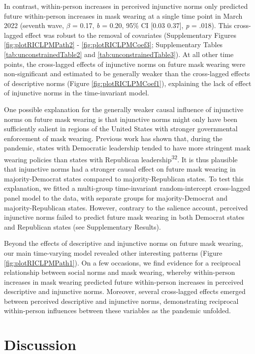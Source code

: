 \documentclass[
  man, donotrepeattitle,floatsintext]{apa6}
\begin{document}
In contrast, within-person increases in perceived injunctive norms only predicted future within-person increases in mask wearing at a single time point in March 2022 (seventh wave, \(\beta\) = 0.17, \emph{b} = 0.20, 95\% CI {[}0.03 0.37{]}, \emph{p} = .018). This cross-lagged effect was robust to the removal of covariates (Supplementary Figures \ref{fig:plotRICLPMPath2} - \ref{fig:plotRICLPMCoef3}; Supplementary Tables \ref{tab:unconstrainedTable2} and \ref{tab:unconstrainedTable3}). At all other time points, the cross-lagged effects of injunctive norms on future mask wearing were non-significant and estimated to be generally weaker than the cross-lagged effects of descriptive norms (Figure \ref{fig:plotRICLPMCoef1}), explaining the lack of effect of injunctive norms in the time-invariant model.

One possible explanation for the generally weaker causal influence of injunctive norms on future mask wearing is that injunctive norms might only have been sufficiently salient in regions of the United States with stronger governmental enforcement of mask wearing. Previous work has shown that, during the pandemic, states with Democratic leadership tended to have more stringent mask wearing policies than states with Republican leadership\textsuperscript{32}. It is thus plausible that injunctive norms had a stronger causal effect on future mask wearing in majority-Democrat states compared to majority-Republican states. To test this explanation, we fitted a multi-group time-invariant random-intercept cross-lagged panel model to the data, with separate groups for majority-Democrat and majority-Republican states. However, contrary to the salience account, perceived injunctive norms failed to predict future mask wearing in both Democrat states and Republican states (see Supplementary Results).

Beyond the effects of descriptive and injunctive norms on future mask wearing, our main time-varying model revealed other interesting patterns (Figure \ref{fig:plotRICLPMPath1}). On a few occasions, we find evidence for a reciprocal relationship between social norms and mask wearing, whereby within-person increases in mask wearing predicted future within-person increases in perceived descriptive and injunctive norms. Moreover, several cross-lagged effects emerged between perceived descriptive and injunctive norms, demonstrating reciprocal within-person influences between these variables as the pandemic unfolded.

\hypertarget{discussion}{%
\section{Discussion}\label{discussion}}
\end{document}
